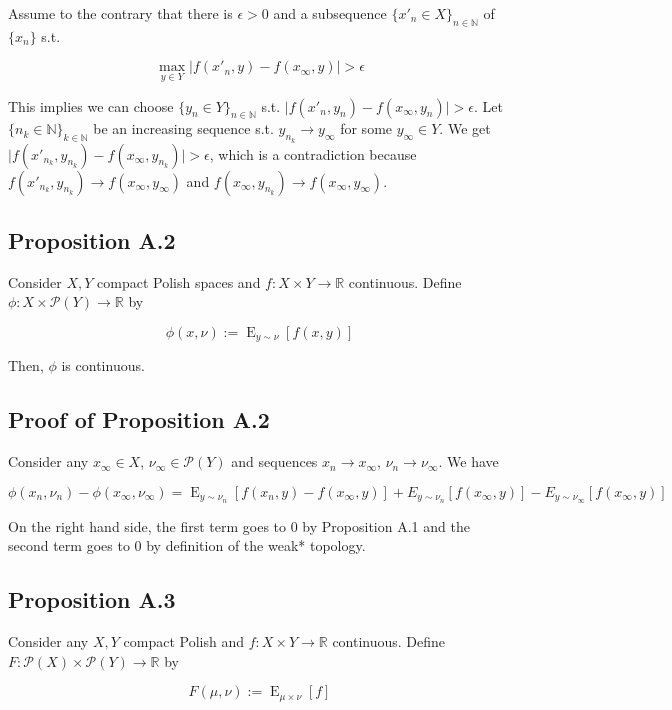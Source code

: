 \documentclass[a4paper]{article}
\DeclareMathOperator{\E}{E}
\newcommand{\Nats}{\mathbb{N}}
\newcommand{\Reals}{\mathbb{R}}
\newcommand{\Abs}[1]{\lvert #1 \rvert}
\newcommand{\Prob}{\mathcal{P}}
\begin{document}
Assume to the contrary that there is ${\epsilon > 0}$ and a subsequence ${\{x'_n \in X\}_{n \in \Nats}}$ of ${\{x_n\}}$ s.t. 

$${\max_{y \in Y} \Abs{f(x'_n,y)-f(x_\infty,y)} > \epsilon}$$

This implies we can choose ${\{y_n \in Y\}_{n \in \Nats}}$ s.t. ${\Abs{f(x'_n,y_n)-f(x_\infty,y_n)} > \epsilon}$. Let ${\{n_k \in \Nats\}_{k \in \Nats}}$ be an increasing sequence s.t. ${y_{n_k} \rightarrow y_\infty}$ for some ${y_\infty \in Y}$. We get ${\Abs{f(x'_{n_k},y_{n_k})-f(x_\infty,y_{n_k})} > \epsilon}$, which is a contradiction because ${f(x'_{n_k},y_{n_k}) \rightarrow f(x_\infty,y_\infty)}$ and ${f(x_\infty,y_{n_k}) \rightarrow f(x_\infty,y_\infty)}$.

\subsection{Proposition A.2}

Consider ${X,Y}$ compact Polish spaces and ${f: X \times Y \rightarrow \Reals}$ continuous. Define ${\phi: X \times \Prob(Y) \rightarrow \Reals}$ by 

$${\phi(x,\nu):=\E_{y \sim \nu}[f(x,y)]}$$ 

Then, ${\phi}$ is continuous.

\subsection{Proof of Proposition A.2}

Consider any ${x_\infty \in X}$, ${\nu_\infty \in \Prob(Y)}$ and sequences ${x_n \rightarrow x_\infty}$, ${\nu_n \rightarrow \nu_\infty}$. We have

$$\phi(x_n,\nu_n)- \phi(x_\infty,\nu_\infty)=\E_{y \sim \nu_n}[f(x_n,y)-f(x_\infty,y)]+E_{y \sim \nu_n}[f(x_\infty,y)]-E_{y \sim \nu_\infty}[f(x_\infty,y)]$$

On the right hand side, the first term goes to 0 by Proposition A.1 and the second term goes to 0 by definition of the weak* topology.

\subsection{Proposition A.3}

Consider any ${X,Y}$ compact Polish and ${f: X \times Y \rightarrow \Reals}$ continuous. Define ${F: \Prob(X) \times \Prob(Y) \rightarrow \Reals}$ by 

$${F(\mu,\nu):=\E_{\mu \times \nu}[f]}$$ 
\end{document}
